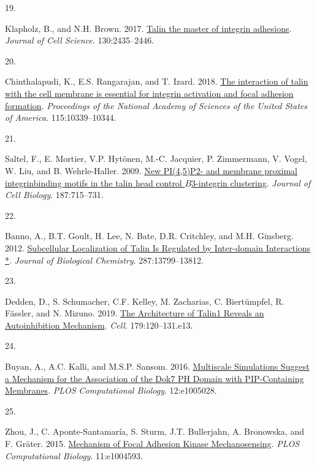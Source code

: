 \documentclass[
  letterpaper,
  DIV=11,
  numbers=noendperiod]{scrartcl}
\newlength{\cslhangindent}
\newlength{\csllabelwidth}
\newlength{\cslentryspacingunit} %
\newenvironment{CSLReferences}[2] %
 {%
  \setlength{\parindent}{0pt}
  \ifodd #1
  \let\oldpar\par
  \def\par{\hangindent=\cslhangindent\oldpar}
  \fi
  \setlength{\parskip}{#2\cslentryspacingunit}
 }%
 {}
\newcommand{\CSLLeftMargin}[1]{\parbox[t]{\csllabelwidth}{#1}}
\newcommand{\CSLRightInline}[1]{\parbox[t]{\linewidth - \csllabelwidth}{#1}\break}
\begin{document}
\begin{CSLReferences}{0}{0}
\leavevmode{}%
\CSLLeftMargin{19. }
\CSLRightInline{Klapholz, B., and N.H. Brown. 2017.
\href{https://doi.org/10.1242/jcs.190991}{Talin \textendash{} the master
of integrin adhesions}. \emph{Journal of Cell Science}. 130:2435--2446.}

\leavevmode{}%
\CSLLeftMargin{20. }
\CSLRightInline{Chinthalapudi, K., E.S. Rangarajan, and T. Izard. 2018.
\href{https://doi.org/10.1073/pnas.1806275115}{The interaction of talin
with the cell membrane is essential for integrin activation and focal
adhesion formation}. \emph{Proceedings of the National Academy of
Sciences of the United States of America}. 115:10339--10344.}

\leavevmode{}%
\CSLLeftMargin{21. }
\CSLRightInline{Saltel, F., E. Mortier, V.P. Hytönen, M.-C. Jacquier, P.
Zimmermann, V. Vogel, W. Liu, and B. Wehrle-Haller. 2009.
\href{https://doi.org/10.1083/jcb.200908134}{New {PI}(4,5){P2-} and
membrane proximal integrin\textendash binding motifs in the talin head
control {\(B\)}3-integrin clustering}. \emph{Journal of Cell Biology}.
187:715--731.}

\leavevmode{}%
\CSLLeftMargin{22. }
\CSLRightInline{Banno, A., B.T. Goult, H. Lee, N. Bate, D.R. Critchley,
and M.H. Ginsberg. 2012.
\href{https://doi.org/10.1074/jbc.M112.341214}{Subcellular
{Localization} of {Talin Is Regulated} by {Inter-domain Interactions}
*}. \emph{Journal of Biological Chemistry}. 287:13799--13812.}

\leavevmode{}%
\CSLLeftMargin{23. }
\CSLRightInline{Dedden, D., S. Schumacher, C.F. Kelley, M. Zacharias, C.
Biertümpfel, R. Fässler, and N. Mizuno. 2019.
\href{https://doi.org/10.1016/j.cell.2019.08.034}{The {Architecture} of
{Talin1 Reveals} an {Autoinhibition Mechanism}}. \emph{Cell}.
179:120--131.e13.}

\leavevmode{}%
\CSLLeftMargin{24. }
\CSLRightInline{Buyan, A., A.C. Kalli, and M.S.P. Sansom. 2016.
\href{https://doi.org/10.1371/journal.pcbi.1005028}{Multiscale
{Simulations Suggest} a {Mechanism} for the {Association} of the {Dok7
PH Domain} with {PIP-Containing Membranes}}. \emph{PLOS Computational
Biology}. 12:e1005028.}

\leavevmode{}%
\CSLLeftMargin{25. }
\CSLRightInline{Zhou, J., C. Aponte-Santamaría, S. Sturm, J.T.
Bullerjahn, A. Bronowska, and F. Gräter. 2015.
\href{https://doi.org/10.1371/journal.pcbi.1004593}{Mechanism of {Focal
Adhesion Kinase Mechanosensing}}. \emph{PLOS Computational Biology}.
11:e1004593.}


\end{CSLReferences}
\end{document}
